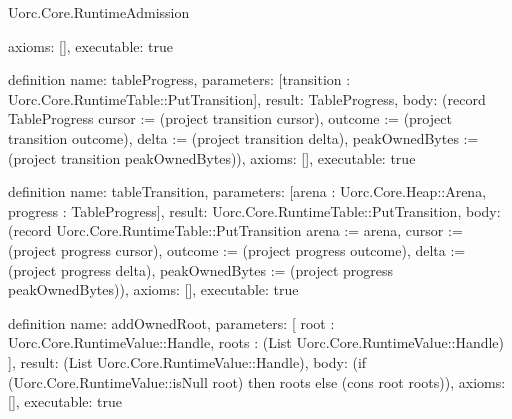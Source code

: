 \begin{lexlean}{Uorc.Core.RuntimeAdmission}
\begin{semanticmodule}
{  axioms: [],
  executable: true
}

definition{
  name: tableProgress,
  parameters: [transition : Uorc.Core.RuntimeTable::PutTransition],
  result: TableProgress,
  body: (record TableProgress {cursor := (project transition cursor), outcome := (project transition outcome), delta := (project transition delta), peakOwnedBytes := (project transition peakOwnedBytes)}),
  axioms: [],
  executable: true
}

definition{
  name: tableTransition,
  parameters: [arena : Uorc.Core.Heap::Arena, progress : TableProgress],
  result: Uorc.Core.RuntimeTable::PutTransition,
  body: (record Uorc.Core.RuntimeTable::PutTransition {arena := arena, cursor := (project progress cursor), outcome := (project progress outcome), delta := (project progress delta), peakOwnedBytes := (project progress peakOwnedBytes)}),
  axioms: [],
  executable: true
}

definition{
  name: addOwnedRoot,
  parameters: [
    root : Uorc.Core.RuntimeValue::Handle,
    roots : (List Uorc.Core.RuntimeValue::Handle)
  ],
  result: (List Uorc.Core.RuntimeValue::Handle),
  body: (if (Uorc.Core.RuntimeValue::isNull root) then roots else (cons root roots)),
  axioms: [],
  executable: true
}


\end{semanticmodule}
\end{lexlean}
